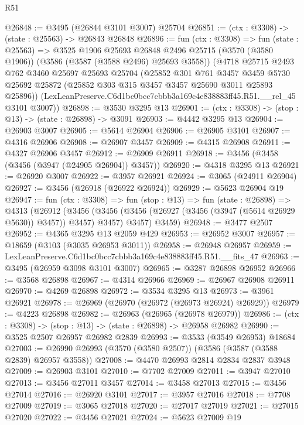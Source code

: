 \begin{lexlean}{R51}
\begin{coremodule}
@26848 := @3495 (@26844 @3101 @3007) @25704
@26851 := (ctx : @3308) -> (state : @25563) -> @26843 @26848
@26896 := fun (ctx : @3308) =>
  fun (state : @25563) =>
  @3525
    @1906
    @25693
    @26848
    @2496
    @25715
    (@3570 (@3580 @1906))
    (@3586 (@3587 (@3588 @2496) @25693 @3558))
    (@4718
      @25715
      @2493
      @762
      @3460
      @25697
      @25693
      @25704
      (@25852
        @301
        @761
        @3457
        @3459
        @5730
        @25692
        @25872
        (@25852 @303 @315 @3457 @3457 @25690 @3011 @25893 @25896))
      (LexLeanPreserve.C6d1bc0bcc7cbbb3a169c4e838883ff45.R51.__rel_45 @3101 @3007))
@26898 := @3530 @3295 @13
@26901 := (ctx : @3308) -> (stop : @13) -> (state : @26898) -> @3091
@26903 := @4442 @3295 @13
@26904 := @26903 @3007
@26905 := @5614 @26904
@26906 := @26905 @3101
@26907 := @4316 @26906
@26908 := @26907 @3457
@26909 := @4315 @26908
@26911 := @4327 @26906 @3457
@26912 := @26909 @26911
@26918 := @3456 (@3458 (@3456 (@3947 (@24905 @26904)) @3457))
@26920 := @4318 @3295 @13
@26921 := @26920 @3007
@26922 := @3957 @26921
@26924 := @3065 (@24911 @26904)
@26927 := @3456 (@26918 (@26922 @26924))
@26929 := @5623 @26904 @19
@26947 := fun (ctx : @3308) =>
  fun (stop : @13) =>
  fun (state : @26898) =>
  @4313
    (@26912
      (@3456 (@3456 (@3456 (@26927 (@3456 (@3947 (@5614 @26929 @5630)) @3457)) @3457) @3457) @3457)
      @3459)
@26948 := @3477 @2507
@26952 := @4365 @3295 @13 @2059 @429
@26953 := @26952 @3007
@26957 := @18659 (@3103 (@3035 @26953 @3011))
@26958 := @26948 @26957
@26959 := LexLeanPreserve.C6d1bc0bcc7cbbb3a169c4e838883ff45.R51.__fits_47
@26963 := @3495 (@26959 @3098 @3101 @3007)
@26965 := @3287 @26898 @26952
@26966 := @3568 @26898
@26967 := @4314 @26966
@26969 := @26967 @26908 @26911
@26970 := @4269 @26898
@26972 := @3534 @3295 @13
@26973 := @3961 @26921
@26978 := @26969 (@26970 (@26972 (@26973 @26924) @26929))
@26979 := @4223 @26898
@26982 := @26963 (@26965 (@26978 @26979))
@26986 := (ctx : @3308) -> (stop : @13) -> (state : @26898) -> @26958 @26982
@26990 := @3525 @2507 @26957 @26982 @2839
@26993 := @3533 (@3549 @26953) @18684
@27003 := @26990 @26993 (@3570 (@3580 @2507)) (@3586 (@3587 (@3588 @2839) @26957 @3558))
@27008 := @4470 @26993 @2814 @2834 @2837 @3948
@27009 := @26903 @3101
@27010 := @7702 @27009
@27011 := @3947 @27010
@27013 := @3456 @27011 @3457
@27014 := @3458 @27013
@27015 := @3456 @27014
@27016 := @26920 @3101
@27017 := @3957 @27016
@27018 := @7708 @27009
@27019 := @3065 @27018
@27020 := @27017 @27019
@27021 := @27015 @27020
@27022 := @3456 @27021
@27024 := @5623 @27009 @19

\end{coremodule}
\end{lexlean}
